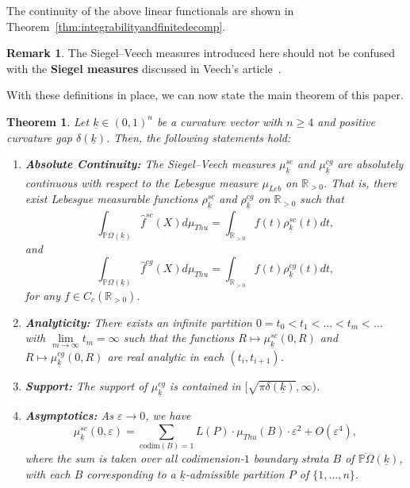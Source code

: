 \documentclass{compositio}
\numberwithin{equation}{section}
\numberwithin{figure}{section}
\theoremstyle{definition}
\newtheorem{remark}[definition]{Remark}
\theoremstyle{plain}
\newtheorem{theorem}[definition]{Theorem}
\begin{document}
{The continuity of the above linear functionals are shown in Theorem~\ref{thm:integrabilityandfinitedecomp}.

\begin{remark}
    The Siegel--Veech measures introduced here should not be confused with the \textbf{Siegel measures} discussed in Veech's article~\cite{Veech}.
\end{remark}

With these definitions in place, we can now state the main theorem of this paper.

\begin{theorem}\label{thm:main3}
    Let $\underline{k}\in(0,1)^n$ be a curvature vector with $n \ge 4$ and positive curvature gap $\delta(\underline{k})$. Then, the following statements hold:
    \begin{enumerate}
        \item \textbf{Absolute Continuity:}
        The Siegel–Veech measures $\mu^{sc}_{\underline{k}}$ and $\mu^{cg}_{\underline{k}}$ are absolutely continuous with respect to the Lebesgue measure $\mu_{Leb}$ on $\mathbb{R}_{>0}$. That is, there exist Lebesgue measurable functions $\rho^{sc}_{\underline{k}}$ and $\rho^{cg}_{\underline{k}}$ on $\mathbb{R}_{>0}$ such that
$$
            \int_{\mathbb{P}\Omega(\underline{k})}\hat{f}^{sc}(X)d\mu_{Thu} = \int_{\mathbb{R}_{>0}}f(t)\rho^{sc}_{\underline{k}}(t)dt,
$$
        and
$$
            \int_{\mathbb{P}\Omega(\underline{k})}\hat{f}^{cg}(X)d\mu_{Thu} = \int_{\mathbb{R}_{>0}}f(t)\rho^{cg}_{\underline{k}}(t)dt,
$$
        for any $f \in C_c(\mathbb{R}_{>0})$.
        
        \item \textbf{Analyticity:}  
        There exists an infinite partition $0 = t_0 < t_1 < \ldots < t_m < \ldots$ with $\lim\limits_{m \to \infty} t_m = \infty$ such that the functions
        $R \mapsto \mu^{sc}_{\underline{k}}(0, R)$ and  $R \mapsto \mu^{cg}_{\underline{k}}(0, R)$
        are real analytic in each $(t_i, t_{i+1})$.

        \item \textbf{Support:}
        The support of $\mu^{cg}_{\underline k}$ is contained in $\big[\sqrt{\pi\delta(\underline{k})},\infty\big)$.

        \item \textbf{Asymptotics:}  
        As $\varepsilon\to0$, we have
        \begin{equation}\label{equ:mainasym}
            \mu^{sc}_{\underline{k}}(0,\varepsilon)=\sum\limits_{\mathrm{codim}(B)=1} L(P)\cdot\mu_{Thu}(B)\cdot\varepsilon^2 + O(\varepsilon^4),
        \end{equation}
        where the sum is taken over all codimension-$1$ boundary strata $B$ of $\overline{\mathbb{P}\Omega}(\underline{k})$, with each $B$ corresponding to a $\underline{k}$-admissible partition $P$ of $\{1,\ldots,n\}$.
    \end{enumerate}
\end{theorem}

}
\end{document}
